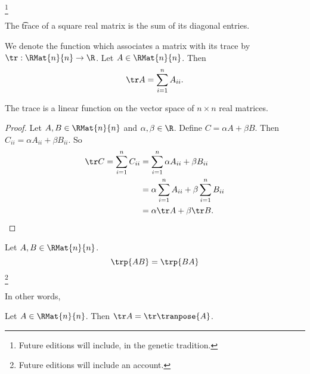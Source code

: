 
\footnote{Future editions will include, in the genetic tradition.}


The \t{trace} of a square real matrix is the sum of its diagonal entries.


We denote the function which associates a matrix with its trace by $\tr: \RMat{n}{n} \to \R$.
Let $A \in \RMat{n}{n}$.
Then
$$
  \tr A = \sum_{i = 1}^{n} A_{ii}.
$$


\begin{prop}

The trace is a linear function on the vector space of $n \times n$ real matrices.

\begin{proof}

Let $A, B \in \RMat{n}{n}$ and $\alpha, \beta \in \R$.
Define $C = \alpha A + \beta B$.
Then $C_{ii} = \alpha A_{ii} + \beta B_{ii}$.
So
\[
\begin{aligned}
  \tr C = \sum_{i = 1}^{n} C_{ii} &= \sum_{i = 1}^{n} \alpha A_{ii} + \beta B_{ii} \\ &= \alpha \sum_{i = 1}^{n} A_{ii} + \beta \sum_{i = 1}^{n} B_{ii} \\ &= \alpha \tr A + \beta \tr B.
\end{aligned}
\]

\end{proof}

\end{prop}

\begin{prop}

Let $A, B \in \RMat{n}{n}$.
  $$\trp{AB} = \trp{BA}$$\footnote{Future editions will include an account.}

\end{prop}

In other words, 

\begin{prop}

  Let $A \in \RMat{n}{n}$. Then $\tr A = \tr\tranpose{A}$.

\end{prop}
